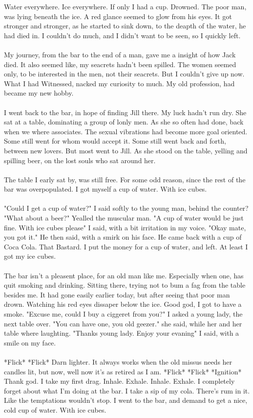 \documentclass[]{article}
\begin{document}
Water everywhere. Ice everywhere. If only I had a cup. Drowned. The poor man, was lying beneath the ice. A red glance seemed to glow from his eyes. It got stronger and stronger, as he started to sink down, to the deapth of the water, he had died in. I couldn't do much, and I didn't want to be seen, so I quickly left.
\\ \\
My journey, from the bar to the end of a man, gave me a insight of how Jack died. It also seemed like, my seacrets hadn't been spilled. The women seemed only, to be interested in the men, not their seacrets. But I couldn't give up now. What I had Witnessed, nacked my curiosity to much. My old profession, had became my new hobby. 
\\ \\
I went back to the bar, in hope of finding Jill there. My luck hadn't run dry. She sat at a table, dominating a group of lonly men. As she so often had done, back when we where associates. The sexual vibrations had become more goal oriented. Some still went for whom would accept it. Some still went back and forth, between new lovers. But most went to Jill. As she stood on the table, yelling and spilling beer, on the lost souls who sat around her.
\\ \\
The table I early sat by, was still free. For some odd reason, since the rest of the bar was overpopulated. I got myself a cup of water. With ice cubes.
\\ \\
"Could I get a cup of water?" I said softly to the young man, behind the counter?
"What about a beer?" Yealled the muscular man.
"A cup of water would be just fine. With ice cubes please" I said, with a bit irritation in my voice. 
"Okay mate, you got it." He then said, with a smirk on his face. 
He came back with a cup of Coca Cola. That Bastard. I put the money for a cup of water, and left. At least I got my ice cubes.
\\ \\
The bar isn't a pleasent place, for an old man like me. Especially when one, has quit smoking and drinking. Sitting there, trying not to bum a fag from the table besides me. It had gone easily earlier today, but after seeing that poor man drown. Watching his red eyes dissaper below the ice. Good god, I got to have a smoke. "Excuse me, could I buy a ciggeret from you?" I asked a young lady, the next table over. "You can have one, you old geezer." she said, while her and her table where laughting. "Thanks young lady. Enjoy your evaning" I said, with a smile on my face. 
\\ \\
*Flick* *Flick* Darn lighter. It always works when the old missus needs her candles lit, but now, well now it's as retired as I am. *Flick* *Flick* *Ignition* Thank god. I take my first drag. Inhale. Exhale. Inhale. Exhale. I completely forget about what I'm doing at the bar. I take a sip of my cola. There's rum in it. Like the temptations wouldn't stop. I went to the bar, and demand to get a nice, cold cup of water. With ice cubes.
\end{document}
